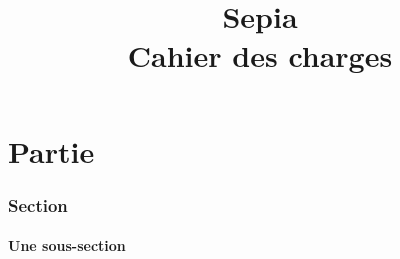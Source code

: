 \documentclass{article}
\title{Sepia\\Cahier des charges}
\begin{document}
\maketitle
\newpage
\part{Partie}
\section{Section}
\subsection{Une sous-section}
\end{document}
